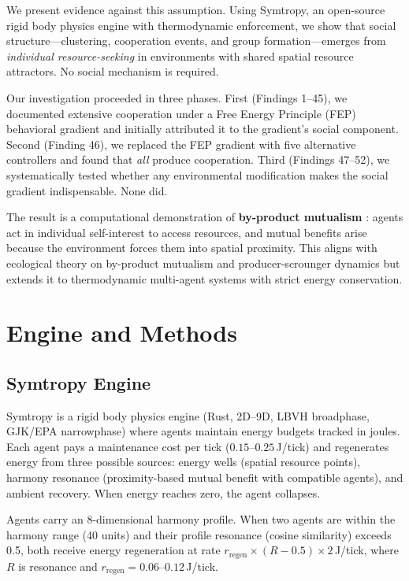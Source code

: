 \documentclass[12pt,a4paper]{article}
\begin{document}
We present evidence against this assumption. Using Symtropy, an open-source rigid body physics engine with thermodynamic enforcement, we show that social structure---clustering, cooperation events, and group formation---emerges from \emph{individual resource-seeking} in environments with shared spatial resource attractors. No social mechanism is required.

Our investigation proceeded in three phases. First (Findings 1--45), we documented extensive cooperation under a Free Energy Principle (FEP) behavioral gradient and initially attributed it to the gradient's social component. Second (Finding 46), we replaced the FEP gradient with five alternative controllers and found that \emph{all} produce cooperation. Third (Findings 47--52), we systematically tested whether any environmental modification makes the social gradient indispensable. None did.

The result is a computational demonstration of \textbf{by-product mutualism} \cite{connor1995}: agents act in individual self-interest to access resources, and mutual benefits arise because the environment forces them into spatial proximity. This aligns with ecological theory on by-product mutualism and producer-scrounger dynamics \cite{giraldeau2000} but extends it to thermodynamic multi-agent systems with strict energy conservation.

\section{Engine and Methods}

\subsection{Symtropy Engine}

Symtropy is a rigid body physics engine (Rust, 2D--9D, LBVH broadphase, GJK/EPA narrowphase) where agents maintain energy budgets tracked in joules. Each agent pays a maintenance cost per tick ($0.15$--$0.25$\,J/tick) and regenerates energy from three possible sources: energy wells (spatial resource points), harmony resonance (proximity-based mutual benefit with compatible agents), and ambient recovery. When energy reaches zero, the agent collapses.

Agents carry an 8-dimensional harmony profile. When two agents are within the harmony range (40 units) and their profile resonance (cosine similarity) exceeds 0.5, both receive energy regeneration at rate $r_{\text{regen}} \times (R - 0.5) \times 2$\,J/tick, where $R$ is resonance and $r_{\text{regen}} = 0.06$--$0.12$\,J/tick.
\end{document}
